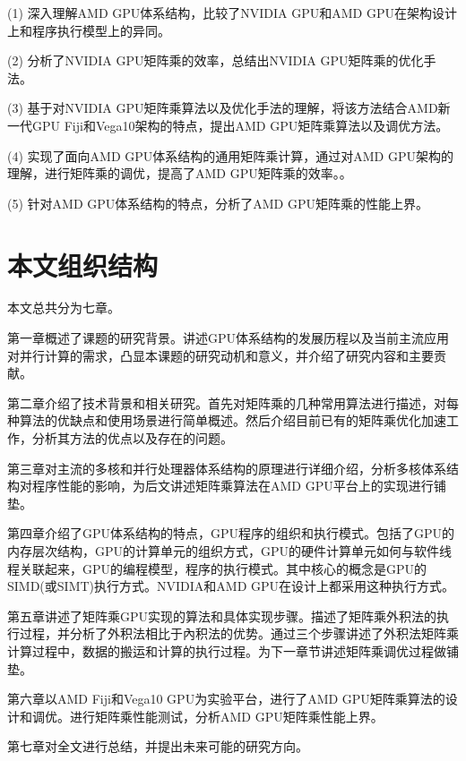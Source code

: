  (1) 深入理解AMD GPU体系结构，比较了NVIDIA GPU和AMD GPU在架构设计上和程序执行模型上的异同。

 (2) 分析了NVIDIA GPU矩阵乘的效率，总结出NVIDIA GPU矩阵乘的优化手法。

 (3) 基于对NVIDIA GPU矩阵乘算法以及优化手法的理解，将该方法结合AMD新一代GPU Fiji和Vega10架构的特点，提出AMD GPU矩阵乘算法以及调优方法。

 (4) 实现了面向AMD GPU体系结构的通用矩阵乘计算，通过对AMD GPU架构的理解，进行矩阵乘的调优，提高了AMD GPU矩阵乘的效率。。

 (5) 针对AMD GPU体系结构的特点，分析了AMD GPU矩阵乘的性能上界。


\section{本文组织结构}
本文总共分为七章。

第一章概述了课题的研究背景。讲述GPU体系结构的发展历程以及当前主流应用对并行计算的需求，凸显本课题的研究动机和意义，并介绍了研究内容和主要贡献。

第二章介绍了技术背景和相关研究。首先对矩阵乘的几种常用算法进行描述，对每种算法的优缺点和使用场景进行简单概述。然后介绍目前已有的矩阵乘优化加速工作，分析其方法的优点以及存在的问题。

第三章对主流的多核和并行处理器体系结构的原理进行详细介绍，分析多核体系结构对程序性能的影响，为后文讲述矩阵乘算法在AMD GPU平台上的实现进行铺垫。

第四章介绍了GPU体系结构的特点，GPU程序的组织和执行模式。包括了GPU的内存层次结构，GPU的计算单元的组织方式，GPU的硬件计算单元如何与软件线程关联起来，GPU的编程模型，程序的执行模式。其中核心的概念是GPU的SIMD(或SIMT)执行方式。NVIDIA和AMD GPU在设计上都采用这种执行方式。

第五章讲述了矩阵乘GPU实现的算法和具体实现步骤。描述了矩阵乘外积法的执行过程，并分析了外积法相比于內积法的优势。通过三个步骤讲述了外积法矩阵乘计算过程中，数据的搬运和计算的执行过程。为下一章节讲述矩阵乘调优过程做铺垫。

第六章以AMD Fiji和Vega10 GPU为实验平台，进行了AMD GPU矩阵乘算法的设计和调优。进行矩阵乘性能测试，分析AMD GPU矩阵乘性能上界。

第七章对全文进行总结，并提出未来可能的研究方向。



